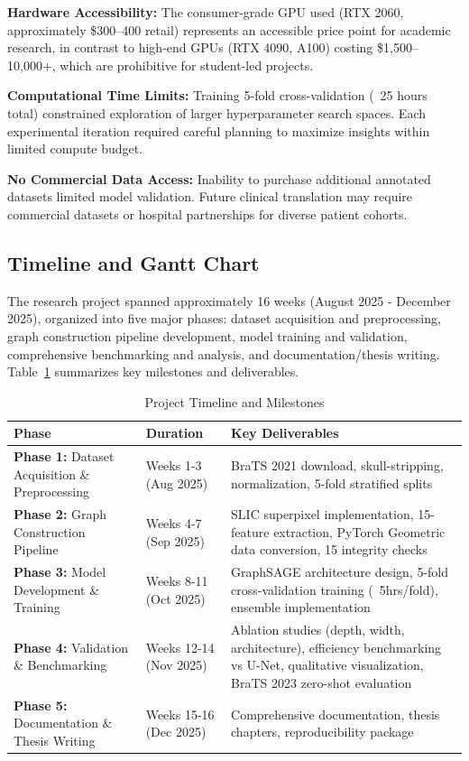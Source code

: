 \textbf{Hardware Accessibility:} The consumer-grade GPU used (RTX 2060, approximately \$300--400 retail) represents an accessible price point for academic research, in contrast to high-end GPUs (RTX 4090, A100) costing \$1,500--10,000+, which are prohibitive for student-led projects.

\textbf{Computational Time Limits:} Training 5-fold cross-validation (~25 hours total) constrained exploration of larger hyperparameter search spaces. Each experimental iteration required careful planning to maximize insights within limited compute budget.

\textbf{No Commercial Data Access:} Inability to purchase additional annotated datasets limited model validation. Future clinical translation may require commercial datasets or hospital partnerships for diverse patient cohorts.


\subsection{Timeline and Gantt Chart}

The research project spanned approximately 16 weeks (August 2025 - December 2025), organized into five major phases: dataset acquisition and preprocessing, graph construction pipeline development, model training and validation, comprehensive benchmarking and analysis, and documentation/thesis writing. Table~\ref{tab:timeline} summarizes key milestones and deliverables.

\begin{table}[htbp]
\caption{Project Timeline and Milestones}
\label{tab:timeline}
\begin{center}
\begin{tabularx}{\textwidth} { 
  | >{\raggedright\arraybackslash}X 
  | >{\centering\arraybackslash}X 
  | >{\raggedright\arraybackslash}X 
  | }
\hline
\textbf{Phase} & \textbf{Duration} & \textbf{Key Deliverables}\\
\hline
\textbf{Phase 1:} Dataset Acquisition \& Preprocessing & Weeks 1-3 (Aug 2025) & BraTS 2021 download, skull-stripping, normalization, 5-fold stratified splits\\
\hline
\textbf{Phase 2:} Graph Construction Pipeline & Weeks 4-7 (Sep 2025) & SLIC superpixel implementation, 15-feature extraction, PyTorch Geometric data conversion, 15 integrity checks\\
\hline
\textbf{Phase 3:} Model Development \& Training & Weeks 8-11 (Oct 2025) & GraphSAGE architecture design, 5-fold cross-validation training (~5hrs/fold), ensemble implementation\\
\hline
\textbf{Phase 4:} Validation \& Benchmarking & Weeks 12-14 (Nov 2025) & Ablation studies (depth, width, architecture), efficiency benchmarking vs U-Net, qualitative visualization, BraTS 2023 zero-shot evaluation\\
\hline
\textbf{Phase 5:} Documentation \& Thesis Writing & Weeks 15-16 (Dec 2025) & Comprehensive documentation, thesis chapters, reproducibility package\\
\hline
\end{tabularx}
\end{center}
\end{table}

